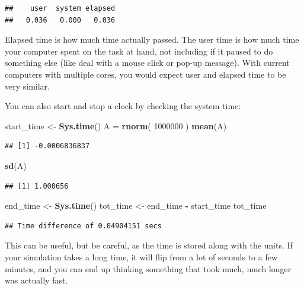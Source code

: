\documentclass[
]{book}
\newenvironment{Shaded}{\begin{snugshade}}{\end{snugshade}}
\newcommand{\DecValTok}[1]{\textcolor[rgb]{0.00,0.00,0.81}{#1}}
\newcommand{\FunctionTok}[1]{\textcolor[rgb]{0.13,0.29,0.53}{\textbf{#1}}}
\newcommand{\NormalTok}[1]{#1}
\newcommand{\OtherTok}[1]{\textcolor[rgb]{0.56,0.35,0.01}{#1}}
\newcommand{\SpecialCharTok}[1]{\textcolor[rgb]{0.81,0.36,0.00}{\textbf{#1}}}
\begin{document}
\begin{verbatim}
##    user  system elapsed 
##   0.036   0.000   0.036
\end{verbatim}

Elapsed time is how much time actually passed.
The user time is how much time your computer spent on the task at hand, not including if it paused to do something else (like deal with a mouse click or pop-up message).
With current computers with multiple cores, you would expect user and elapsed time to be very similar.

You can also start and stop a clock by checking the system time:

\begin{Shaded}
\begin{Highlighting}[]
\NormalTok{start\_time }\OtherTok{\textless{}{-}} \FunctionTok{Sys.time}\NormalTok{()}
\NormalTok{A }\OtherTok{=} \FunctionTok{rnorm}\NormalTok{( }\DecValTok{1000000}\NormalTok{ )}
\FunctionTok{mean}\NormalTok{(A)}
\end{Highlighting}
\end{Shaded}

\begin{verbatim}
## [1] -0.0006836837
\end{verbatim}

\begin{Shaded}
\begin{Highlighting}[]
\FunctionTok{sd}\NormalTok{(A)}
\end{Highlighting}
\end{Shaded}

\begin{verbatim}
## [1] 1.000656
\end{verbatim}

\begin{Shaded}
\begin{Highlighting}[]
\NormalTok{end\_time }\OtherTok{\textless{}{-}} \FunctionTok{Sys.time}\NormalTok{()}
\NormalTok{tot\_time }\OtherTok{\textless{}{-}}\NormalTok{ end\_time }\SpecialCharTok{{-}}\NormalTok{ start\_time}
\NormalTok{tot\_time}
\end{Highlighting}
\end{Shaded}

\begin{verbatim}
## Time difference of 0.04904151 secs
\end{verbatim}

This can be useful, but be careful, as the time is stored along with the units. If your simulation takes a long time, it will flip from a lot of seconds to a few minutes, and you can end up thinking something that took much, much longer was actually fast.
\end{document}
